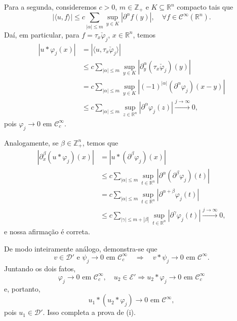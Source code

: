 \documentclass[../distribution_theory_notes.tex]{subfiles}
\begin{document}
\begin{proof*}
	Para a segunda, consideremos \(c>0\), \(m\in \mathbb{Z}_{+}\) e \(K\subseteq \mathbb{R}^{n}\) compacto tais que
	\[
		|\langle u,f\rangle|
		\leq c\sum\limits_{|\alpha|\leq m}\sup_{y\in K}|\partial^{\alpha}f(y)|,
		\quad \forall f\in \mathcal{C}^{\infty}(\mathbb{R}^{n}).
	\]
	Daí, em particular, para \(f=\tau_{x}\check{\varphi}_{j}\), \(x\in \mathbb{R}^{n}\), temos
	\begin{align*}
		|u*\varphi_{j}(x)|
		 & =|\langle u,\tau_{x}\check{\varphi}_{j}\rangle|                                               \\
		 & \leq c\sum\limits_{|\alpha|\leq m}\sup_{y\in K}
		|\partial_{y}^{\alpha}(\tau_{x}\check{\varphi}_{j})(y)|                                          \\
		 & =c\sum\limits_{|\alpha|\leq m}\sup_{y\in K}
		|(-1)^{|\alpha|}(\partial^{\alpha}\varphi_{j})(x-y)|                                             \\
		 & \leq c\sum\limits_{|\alpha|\leq m}\sup_{z\in \mathbb{R}^{n}}|\partial^{\alpha}\varphi_{j}(z)|
		\stackrel{j\to\infty}{\longrightarrow}0,
	\end{align*}
	pois \(\varphi_{j}\to0\) em \(\mathcal{C}_{c}^{\infty}\).

	Analogamente, se \(\beta\in \mathbb{Z}_{+}^{n}\), temos que
	\begin{align*}
		|\partial_{x}^{\beta}(u*\varphi_{j})(x)|
		 & =|u*(\partial^{\beta}\varphi_{j})(x)|                                \\
		 & \leq c\sum\limits_{|\alpha|\leq m}\sup_{t\in \mathbb{R}^{n}}
		|\partial^{\alpha}(\partial^{\beta}\varphi_{j})(t)|                     \\
		 & =c\sum\limits_{|\alpha|\leq m}\sup_{t\in \mathbb{R}^{n}}
		|\partial^{\alpha+\beta}\varphi_{j}(t)|                                 \\
		 & \leq c\sum\limits_{|\gamma|\leq m+|\beta|}\sup_{t\in \mathbb{R}^{n}}
		|\partial^{\gamma}\varphi_{j}(t)|
		\stackrel{j\to\infty}{\longrightarrow}0,
	\end{align*}
	e nossa afirmação é correta.

	De modo inteiramente análogo, demonstra-se que
	\[
		v\in \mathcal{D}'\text{ e }\psi_{j}\longrightarrow0\text{ em }\mathcal{C}_{c}^{\infty}
		\quad\Longrightarrow\quad
		v*\psi_{j}\longrightarrow0\text{ em }\mathcal{C}^{\infty}.
	\]
	Juntando os dois fatos,
	\[
		\varphi_{j}\to0\text{ em }\mathcal{C}_{c}^{\infty},\quad u_{2}\in \mathcal{E}'
		\Longrightarrow u_{2}*\varphi_{j}\to0\text{ em }\mathcal{C}_{c}^{\infty}
	\]
	e, portanto,
	\[
		u_{1}*(u_{2}*\varphi_{j})\longrightarrow0\text{ em }\mathcal{C}^{\infty},
	\]
	pois \(u_{1}\in \mathcal{D}'\). Isso completa a prova de (i). \qedsymbol
\end{proof*}
\end{document}
